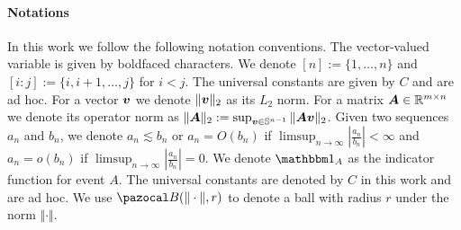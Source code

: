 
\paragraph{Notations}
In this work we follow the following notation conventions. The vector-valued variable is given by boldfaced characters. We denote $[n]:=\{1,\ldots,n\}$ and $[i:j]:=\{i,i+1,\ldots, j\}$ for $i<j$. The universal constants are given by $C$ and are ad hoc. For a vector $\boldsymbol{v}$ we denote $\Vert\boldsymbol{v}\Vert_2$ as its $L_2$ norm. For a matrix $\boldsymbol{A}\in\mathbb{R}^{m\times n}$ we denote its operator norm as $\Vert\boldsymbol{A}\Vert_2:=\sup_{\boldsymbol{v}\in\mathbb{S}^{n-1}}\Vert\boldsymbol{A}\boldsymbol{v}\Vert_2$. Given two sequences $a_n$ and $b_n$, we denote $a_n\lesssim b_n$ or $a_n = O(b_n)$ if $\limsup_{n\to\infty}|\frac{a_n}{b_n}|<\infty$ and $a_n=o(b_n)$ if $\limsup_{n\to\infty}|\frac{a_n}{b_n}|=0$. We denote $\mbbm 1_A$ as the indicator function for event $A$. The universal constants are denoted by $C$ in this work and are ad hoc. We use $\ca B(\Vert\cdot\Vert, r)$ to denote a ball with radius $r$ under the norm $\Vert\cdot\Vert$.  

